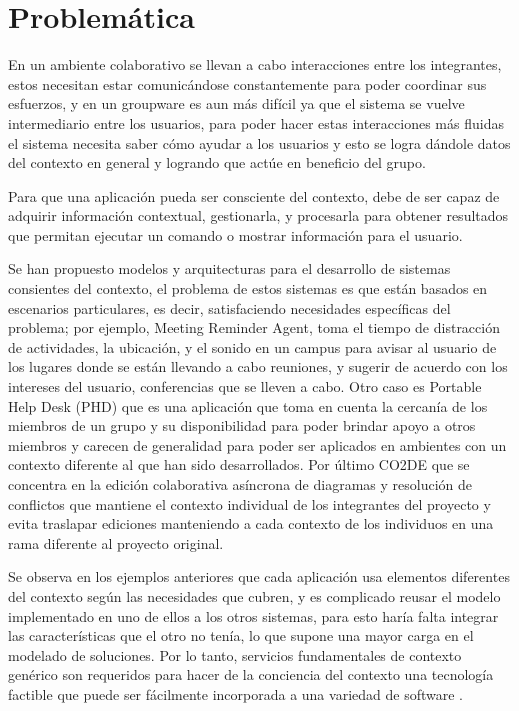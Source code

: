 \section{Problem\'atica}
En un ambiente colaborativo se llevan a cabo interacciones entre los integrantes, estos necesitan estar comunic\'andose  constantemente para poder coordinar sus esfuerzos, y en un groupware es aun m\'as dif\'icil ya que el sistema se vuelve intermediario entre los usuarios,  para poder hacer estas interacciones m\'as fluidas el sistema necesita saber c\'omo ayudar a los usuarios y esto se logra d\'andole datos del contexto en general y logrando que act\'ue  en beneficio del grupo.

Para que una aplicaci\'on pueda ser consciente del contexto, debe de ser capaz de adquirir informaci\'on contextual, gestionarla, y procesarla para obtener resultados que permitan ejecutar un comando o mostrar informaci\'on para el usuario. 


Se han propuesto modelos y arquitecturas para el desarrollo de sistemas consientes del contexto, el problema de estos sistemas es que est\'an basados en escenarios particulares, es decir, satisfaciendo necesidades espec\'ificas del problema; por ejemplo, Meeting Reminder Agent\cite{anhalt2001toward}, toma el tiempo de distracci\'on de actividades, la ubicaci\'on, y el sonido en un campus para avisar al usuario de los lugares donde se est\'an llevando a cabo reuniones, y sugerir de acuerdo con los intereses del usuario, conferencias que se lleven a cabo. Otro caso es Portable Help Desk (PHD) \cite{anhalt2001toward} que es una aplicaci\'on que toma en cuenta la cercan\'ia de los miembros de un grupo y su disponibilidad para poder brindar apoyo a otros miembros y carecen de generalidad para poder ser aplicados en ambientes con un contexto diferente al que han sido desarrollados. Por \'ultimo CO2DE \cite{schmidt1992taking} que se concentra en la edici\'on colaborativa as\'incrona de diagramas y resoluci\'on de conflictos que mantiene el contexto individual de los integrantes del proyecto y evita traslapar ediciones manteniendo a cada contexto de los individuos en una rama diferente al proyecto original.

Se observa en los ejemplos anteriores que cada aplicaci\'on usa elementos diferentes del contexto seg\'un las necesidades que cubren, y es complicado reusar el modelo implementado en uno de ellos a los otros sistemas,  para esto har\'ia falta integrar las caracter\'isticas que el otro no ten\'ia, lo que supone una mayor carga en el modelado de soluciones. Por lo tanto, servicios fundamentales de contexto gen\'erico son requeridos para hacer de la conciencia del contexto una tecnolog\'ia factible que puede ser f\'acilmente incorporada a una variedad de software \cite{pascoe1999}.
 
